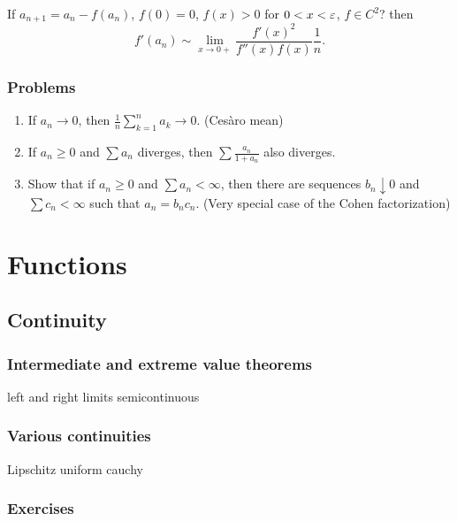 \documentclass{../../large}
\begin{document}
\begin{prb}
If $a_{n+1}=a_n-f(a_n)$, $f(0)=0$, $f(x)>0$ for $0<x<\varepsilon$, $f\in C^2$? then
\[f'(a_n)\sim\lim_{x\to0+}\frac{f'(x)^2}{f''(x)f(x)}\frac1n.\]
\end{prb}
\section*{Problems}
\begin{enumerate}
\item If $a_n\to0$, then $\frac1n\sum_{k=1}^na_k\to0$. (Ces\`aro mean)
\item If $a_n\ge0$ and $\sum a_n$ diverges, then $\sum\frac{a_n}{1+a_n}$ also diverges.
\item Show that if $a_n\ge0$ and $\sum a_n<\infty$, then there are sequences $b_n\downarrow0$ and $\sum c_n<\infty$ such that $a_n=b_nc_n$. (Very special case of the Cohen factorization)
\end{enumerate}






\part{Functions}

\chapter{Continuity}
\section{Intermediate and extreme value theorems}

left and right limits
semicontinuous


\section{Various continuities}

Lipschitz
uniform
cauchy


\section*{Exercises}
\end{document}
